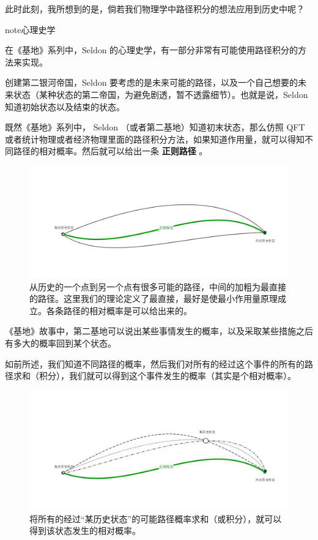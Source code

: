 \documentclass[letterpaper,10pt,english]{sphinxmanual}
\begin{document}
此时此刻，我所想到的是，倘若我们物理学中路径积分的想法应用到历史中呢？

\begin{notice}{note}{心理史学}

在《基地》系列中，Seldon 的心理史学，有一部分非常有可能使用路径积分的方法来实现。

创建第二银河帝国，Seldon 要考虑的是未来可能的路径，以及一个自己想要的未来状态（某种状态的第二帝国，为避免剧透，暂不透露细节）。也就是说，Seldon 知道初始状态以及结束的状态。
\end{notice}

既然《基地》系列中， Seldon （或者第二基地）知道初末状态，那么仿照 QFT 或者统计物理或者经济物理里面的路径积分方法，如果知道作用量，就可以得知不同路径的相对概率。然后就可以给出一条 \textbf{正则路径} 。
\begin{figure}[htbp]
\centering
\capstart

\includegraphics{psychohistory-canonical.png}
\caption{从历史的一个点到另一个点有很多可能的路径，中间的加粗为最直接的路径。这里我们的理论定义了最直接，最好是使最小作用量原理成立。各条路径的相对概率是可以给出来的。}\end{figure}

《基地》故事中，第二基地可以说出某些事情发生的概率，以及采取某些措施之后有多大的概率回到某个状态。

如前所述，我们知道不同路径的概率，然后我们对所有的经过这个事件的所有的路径求和（积分），我们就可以得到这个事件发生的概率（其实是个相对概率）。
\begin{figure}[htbp]
\centering
\capstart

\includegraphics{psychohistory-prob.png}
\caption{将所有的经过“某历史状态”的可能路径概率求和（或积分），就可以得到该状态发生的相对概率。}\end{figure}
\end{document}
